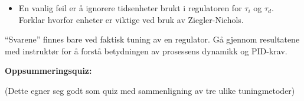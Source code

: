 \begin{itemize}
\item{} En vanlig feil er å ignorere tidsenheter brukt i regulatoren for $\tau_i$ og $\tau_d$. Forklar hvorfor enheter er viktige ved bruk av Ziegler-Nichols.
\end{itemize}







``Svarene'' finnes bare ved faktisk tuning av en regulator. Gå gjennom resultatene med instruktør for å forstå betydningen av prosessens dynamikk og PID-krav.







\vfil \eject

\noindent
{\bf Oppsummeringsquiz:}

(Dette egner seg godt som quiz med sammenligning av tre ulike tuningmetoder)



